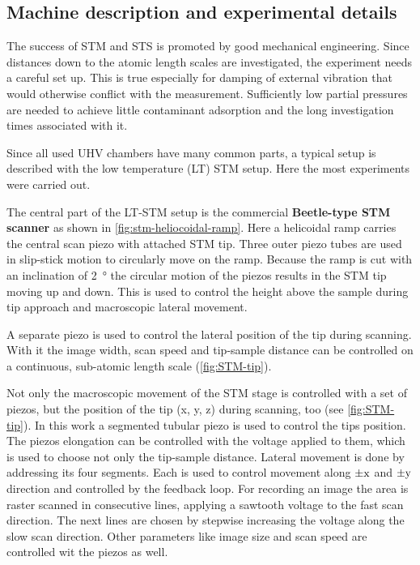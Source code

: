 \subsection{Machine description and experimental details}
The success of STM and STS is promoted by good mechanical engineering. Since distances down to the atomic length scales are investigated, the experiment needs a careful set up. This is true especially for damping of external vibration that would otherwise conflict with the measurement. Sufficiently low partial pressures are needed to achieve little contaminant adsorption and the long investigation times associated with it.

Since all used UHV chambers have many common parts, a typical setup is described with the low temperature (LT) STM setup. Here the most experiments were carried out.

The central part of the LT-STM setup is the commercial \textbf{Beetle-type STM scanner} \cite{zoephel_aufbau_2000} as shown in \autoref{fig:stm-heliocoidal-ramp}. Here a helicoidal ramp carries the central scan piezo with attached STM tip. Three outer piezo tubes are used in slip-stick motion to circularly move on the ramp. Because the ramp is cut with an inclination of \SI{2}{\degree} the circular motion of the piezos results in the STM tip moving up and down. This is used to control the height above the sample during tip approach and macroscopic lateral movement.

A separate piezo is used to control the lateral position of the tip during scanning. With it the image width, scan speed and tip-sample distance can be controlled on a continuous, sub-atomic length scale (\autoref{fig:STM-tip}).

Not only the macroscopic movement of the STM stage is controlled with a set of piezos, but the position of the tip (x, y, z) during scanning, too (see \autoref{fig:STM-tip}). In this work a segmented tubular piezo is used to control the tips position. The piezos elongation can be controlled with the voltage applied to them, which is used to choose not only the tip-sample distance. Lateral movement is done by addressing its four segments. Each is used to control movement along $\pm \textnormal{x}$ and $\pm \textnormal{y}$ direction and controlled by the feedback loop. For recording an image the area is raster scanned in consecutive lines, applying a sawtooth voltage to the fast scan direction. The next lines are chosen by stepwise increasing the voltage along the slow scan direction. Other parameters like image size and scan speed are controlled wit the piezos as well.


